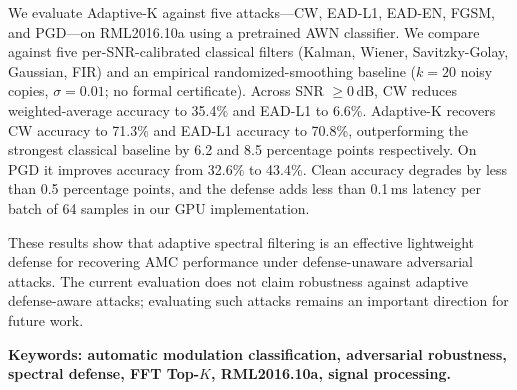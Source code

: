 We evaluate Adaptive-K against five attacks---CW, EAD-L1, EAD-EN, FGSM, and
PGD---on RML2016.10a using a pretrained AWN classifier. We compare against
five per-SNR-calibrated classical filters (Kalman, Wiener, Savitzky-Golay,
Gaussian, FIR) and an empirical randomized-smoothing baseline
($k = 20$ noisy copies, $\sigma = 0.01$; no formal certificate). Across SNR $\geq 0$\,dB, CW reduces weighted-average accuracy to
35.4\% and EAD-L1 to 6.6\%. Adaptive-K recovers CW accuracy to 71.3\% and
EAD-L1 accuracy to 70.8\%, outperforming the strongest classical baseline by
6.2 and 8.5 percentage points respectively. On PGD it improves accuracy from
32.6\% to 43.4\%. Clean accuracy degrades by less than 0.5 percentage points,
and the defense adds less than 0.1\,ms latency per batch of 64 samples in our
GPU implementation.

These results show that adaptive spectral filtering is an effective
lightweight defense for recovering AMC performance under defense-unaware
adversarial attacks. The current evaluation does not claim robustness against
adaptive defense-aware attacks; evaluating such attacks remains an important
direction for future work.

\vspace{1cm}

\textbf{Keywords: automatic modulation classification, adversarial robustness,
spectral defense, FFT Top-$K$, RML2016.10a, signal processing.}
